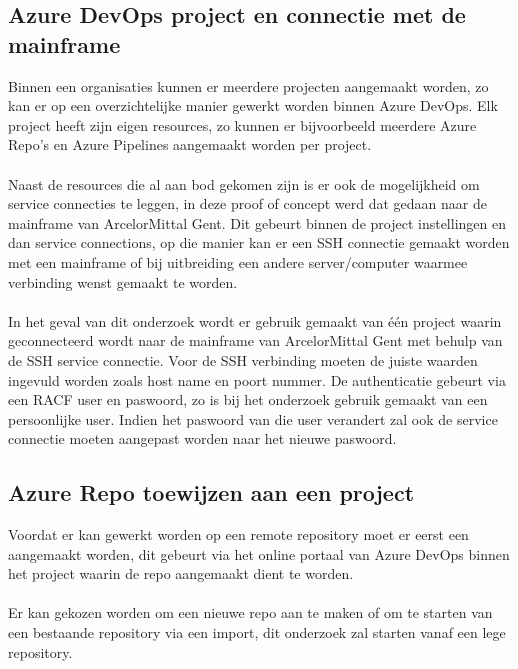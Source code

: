 \subsection{Azure DevOps project en connectie met de mainframe}
Binnen een organisaties kunnen er meerdere projecten aangemaakt worden, zo kan er op een overzichtelijke manier gewerkt worden binnen Azure DevOps. Elk project heeft zijn eigen resources, zo kunnen er bijvoorbeeld meerdere Azure Repo's en Azure Pipelines aangemaakt worden per project. 
\\ \\
Naast de resources die al aan bod gekomen zijn is er ook de mogelijkheid om service connecties te leggen, in deze proof of concept werd dat gedaan naar de mainframe van ArcelorMittal Gent. Dit gebeurt binnen de project instellingen en dan service connections, op die manier kan er een SSH connectie gemaakt worden met een mainframe of bij uitbreiding een andere server/computer waarmee verbinding wenst gemaakt te worden. 
\\ \\
In het geval van dit onderzoek wordt er gebruik gemaakt van één project waarin geconnecteerd wordt naar de mainframe van ArcelorMittal Gent met behulp van de SSH service connectie. Voor de SSH verbinding moeten de juiste waarden ingevuld worden zoals host name en poort nummer. De authenticatie gebeurt via een RACF user en paswoord, zo is bij het onderzoek gebruik gemaakt van een persoonlijke user. Indien het paswoord van die user verandert zal ook de service connectie moeten aangepast worden naar het nieuwe paswoord.

\subsection{Azure Repo toewijzen aan een project}
Voordat er kan gewerkt worden op een remote repository moet er eerst een aangemaakt worden, dit gebeurt via het online portaal van Azure DevOps binnen het project waarin de repo aangemaakt dient te worden. 
\\ \\ 
Er kan gekozen worden om een nieuwe repo aan te maken of om te starten van een bestaande repository via een import, dit onderzoek zal starten vanaf een lege repository. 

